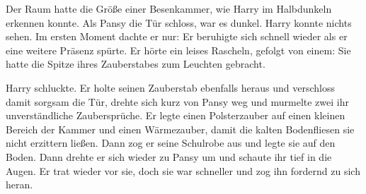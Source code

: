 Der Raum hatte die Größe einer Besenkammer, wie Harry im Halbdunkeln erkennen konnte. Als Pansy die Tür schloss, war es dunkel. Harry konnte nichts sehen. Im ersten Moment dachte er nur:  Er beruhigte sich schnell wieder als er eine weitere Präsenz spürte. Er hörte ein leises Rascheln, gefolgt von einem:  Sie hatte die Spitze ihres Zauberstabes zum Leuchten gebracht.

Harry schluckte. Er holte seinen Zauberstab ebenfalls heraus und verschloss damit sorgsam die Tür, drehte sich kurz von Pansy weg und murmelte zwei ihr unverständliche Zaubersprüche. Er legte einen Polsterzauber auf einen kleinen Bereich der Kammer und einen Wärmezauber, damit die kalten Bodenfliesen sie nicht erzittern ließen. Dann zog er seine Schulrobe aus und legte sie auf den Boden. Dann drehte er sich wieder zu Pansy um und schaute ihr tief in die Augen. Er trat wieder vor sie, doch sie war schneller und zog ihn fordernd zu sich heran.

